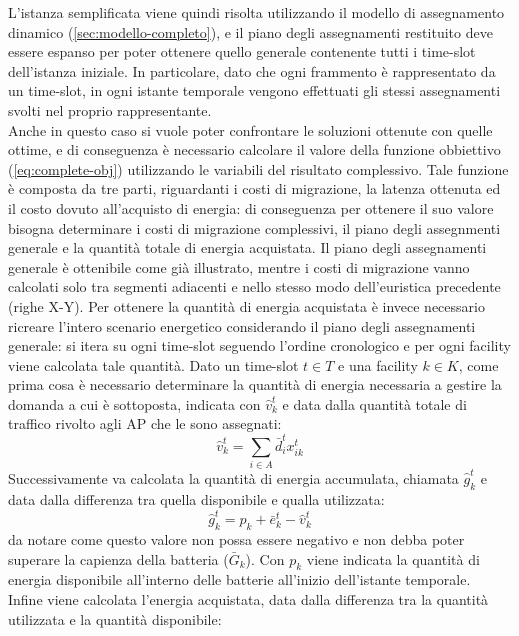 L'istanza semplificata viene quindi risolta utilizzando il modello di assegnamento dinamico (\autoref{sec:modello-completo}), e il piano degli assegnamenti restituito deve essere espanso per poter ottenere quello generale contenente tutti i time-slot dell'istanza iniziale. In particolare, dato che ogni frammento è rappresentato da un time-slot, in ogni istante temporale vengono effettuati gli stessi assegnamenti svolti nel proprio rappresentante.\\
Anche in questo caso si vuole poter confrontare le soluzioni ottenute con quelle ottime, e di conseguenza è necessario calcolare il valore della funzione obbiettivo (\autoref{eq:complete-obj}) utilizzando le variabili del risultato complessivo. Tale funzione è composta da tre parti, riguardanti i costi di migrazione, la latenza ottenuta ed il costo dovuto all'acquisto di energia: di conseguenza per ottenere il suo valore bisogna determinare i costi di migrazione complessivi, il piano degli assegnmenti generale e la quantità totale di energia acquistata. Il piano degli assegnamenti generale è ottenibile come già illustrato, mentre i costi di migrazione vanno calcolati solo tra segmenti adiacenti e nello stesso modo dell'euristica precedente (righe X-Y). Per ottenere la quantità di energia acquistata è invece necessario ricreare l'intero scenario energetico considerando il piano degli assegnamenti generale: si itera su ogni time-slot seguendo l'ordine cronologico e per ogni facility viene calcolata tale quantità. Dato un time-slot $t \in T$ e una facility $k \in K$, come prima cosa è necessario determinare la quantità di energia necessaria a gestire la domanda a cui è sottoposta, indicata con $\hat{v}^t_k$ e data dalla quantità totale di traffico rivolto agli AP che le sono assegnati:
\begin{equation}
    \hat{v}^t_k = \sum_{i \in A} \bar{d}^t_i x^t_{ik}
\end{equation}
Successivamente va calcolata la quantità di energia accumulata, chiamata $\hat{g}^t_k$ e data dalla differenza tra quella disponibile e qualla utilizzata:
\begin{equation}
    \hat{g}^t_k = p_k + \bar{e}^t_k- \hat{v}^t_k
\end{equation}
da notare come questo valore non possa essere negativo e non debba poter superare la capienza della batteria ($\bar{G}_k$). Con $p_k$ viene indicata la quantità di energia disponibile all'interno delle batterie all'inizio dell'istante temporale.\\
Infine viene calcolata l'energia acquistata, data dalla differenza tra la quantità utilizzata e la quantità disponibile:
